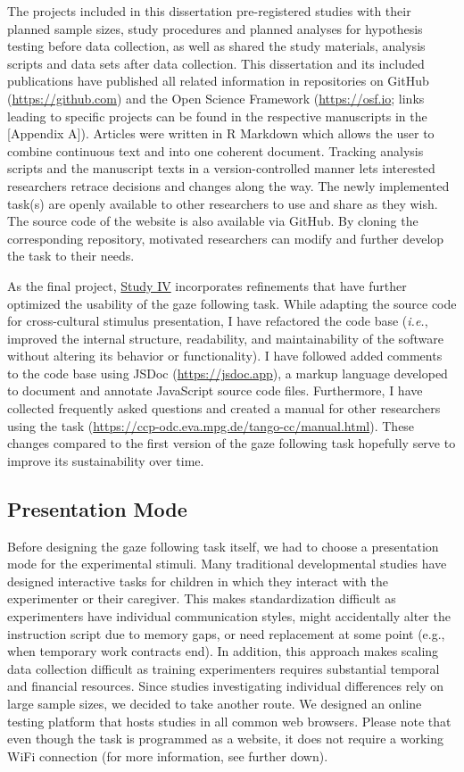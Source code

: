 \documentclass[
]{scrbook}
\begin{document}
The projects included in this dissertation pre-registered studies with their planned sample sizes, study procedures and planned analyses for hypothesis testing before data collection, as well as shared the study materials, analysis scripts and data sets after data collection. This dissertation and its included publications have published all related information in repositories on GitHub (\url{https://github.com}) and the Open Science Framework (\url{https://osf.io}; links leading to specific projects can be found in the respective manuscripts in the {[}Appendix A{]}). Articles were written in R Markdown which allows the user to combine continuous text and into one coherent document. Tracking analysis scripts and the manuscript texts in a version-controlled manner lets interested researchers retrace decisions and changes along the way. The newly implemented task(s) are openly available to other researchers to use and share as they wish. The source code of the website is also available via GitHub. By cloning the corresponding repository, motivated researchers can modify and further develop the task to their needs.

As the final project, \hyperref[studyIV]{Study IV} incorporates refinements that have further optimized the usability of the gaze following task. While adapting the source code for cross-cultural stimulus presentation, I have refactored the code base (\emph{i.e.}, improved the internal structure, readability, and maintainability of the software without altering its behavior or functionality). I have followed added comments to the code base using JSDoc (\url{https://jsdoc.app}), a markup language developed to document and annotate JavaScript source code files. Furthermore, I have collected frequently asked questions and created a manual for other researchers using the task (\url{https://ccp-odc.eva.mpg.de/tango-cc/manual.html}). These changes compared to the first version of the gaze following task hopefully serve to improve its sustainability over time.

\subsection{Presentation Mode}\label{presentation-mode}

Before designing the gaze following task itself, we had to choose a presentation mode for the experimental stimuli. Many traditional developmental studies have designed interactive tasks for children in which they interact with the experimenter or their caregiver. This makes standardization difficult as experimenters have individual communication styles, might accidentally alter the instruction script due to memory gaps, or need replacement at some point (e.g., when temporary work contracts end). In addition, this approach makes scaling data collection difficult as training experimenters requires substantial temporal and financial resources. Since studies investigating individual differences rely on large sample sizes, we decided to take another route. We designed an online testing platform that hosts studies in all common web browsers. Please note that even though the task is programmed as a website, it does not require a working WiFi connection (for more information, see further down).
\end{document}
